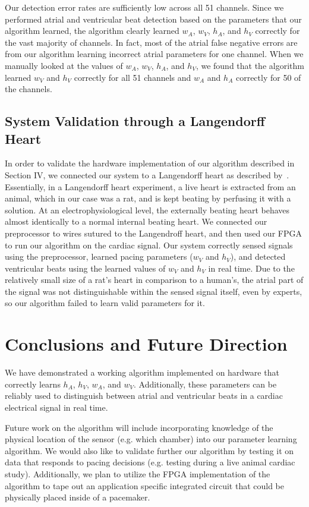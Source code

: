 \documentclass[conference]{IEEEtran}
\newcommand{\APW}{\ensuremath{w_A}}
\newcommand{\VPW}{\ensuremath{w_V}}
\newcommand{\APH}{\ensuremath{h_A}}
\newcommand{\VPH}{\ensuremath{h_V}}
\begin{document}
Our detection error rates are sufficiently low across 
all 51 channels. Since we performed atrial and
ventricular beat detection based on the parameters that
our algorithm learned, the algorithm clearly learned
\APW{}, \VPW{}, \APH{}, and \VPH{} correctly for the vast
majority of channels. In fact, most of the atrial false negative
errors are from our algorithm learning incorrect
atrial parameters for one channel. When we manually
looked at the values of \APW{}, \VPW{}, \APH{}, and \VPH{}, we
found that the algorithm learned \VPW{} and \VPH{} correctly
for all 51 channels and \APW{} and \APH{} correctly for 50 of 
the channels.

\subsection{System Validation through a Langendorff Heart}
In order to validate the hardware implementation of
our algorithm described in Section IV, we connected our 
system to a Langendorff heart as described by~\cite{langendorff}.
Essentially, in a Langendorff heart experiment, a live
heart is extracted from an animal, which in our case was
a rat, and is kept beating by perfusing it with a solution. 
At an electrophysiological level, the externally beating heart behaves almost identically to a normal internal beating heart.
We connected our preprocessor to wires
sutured to the Langendroff heart, and then used our
FPGA to run our algorithm on the cardiac signal.
Our system correctly sensed signals using
the preprocessor, learned pacing parameters (\VPW{} and
\VPH{}), and detected ventricular beats using the learned
values of \VPW{} and \VPH{} in real time. Due to the
relatively small size of a rat's heart in comparison to a
human's, the atrial part of the signal was not
distinguishable within the sensed signal itself, even by experts,
so our algorithm failed to learn valid parameters for it.

\section{Conclusions and Future Direction}
We have demonstrated a working algorithm
implemented on hardware that correctly learns \APH{},
\VPH{}, \APW{}, and \VPW{}. Additionally, these parameters
can be reliably used to distinguish between atrial and
ventricular beats in a cardiac electrical signal in real time.

Future work on the algorithm will include
	incorporating knowledge of the physical location of the sensor (e.g. which chamber) into our parameter learning algorithm.
We would also like to validate further our algorithm by testing it on data that responds to pacing decisions (e.g. testing during a live animal cardiac study).
Additionally, we plan to utilize the FPGA implementation of
the algorithm to tape out an application specific
integrated circuit that could be physically placed inside
of a pacemaker.
\end{document}

